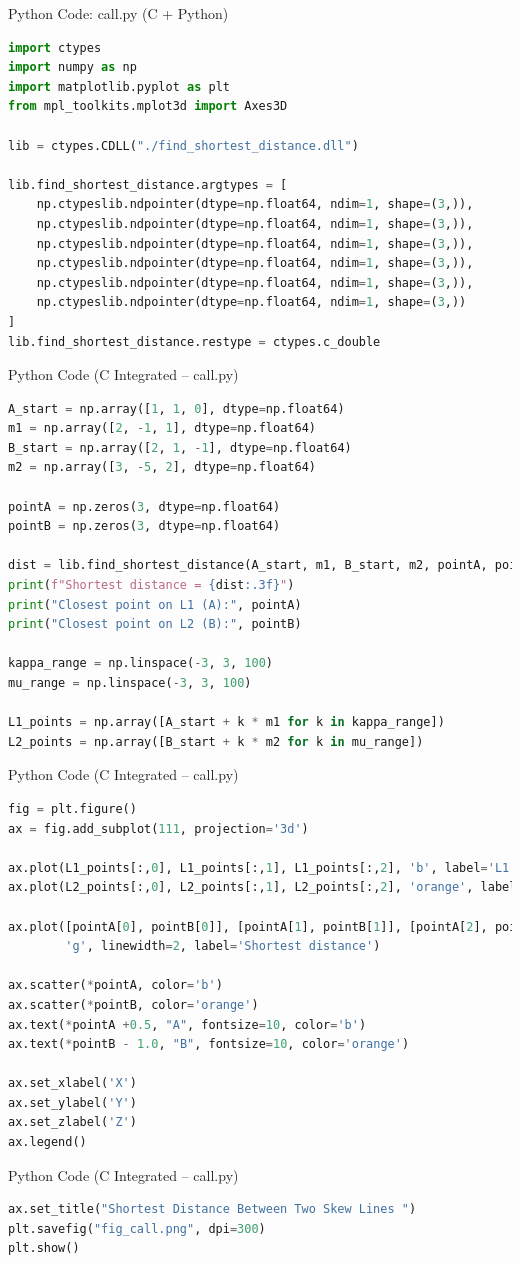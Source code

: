 \documentclass{beamer}
\begin{document}
\begin{frame}[fragile]{Python Code: call.py (C + Python)}
\begin{lstlisting}[language=Python]
import ctypes
import numpy as np
import matplotlib.pyplot as plt
from mpl_toolkits.mplot3d import Axes3D

lib = ctypes.CDLL("./find_shortest_distance.dll")

lib.find_shortest_distance.argtypes = [
    np.ctypeslib.ndpointer(dtype=np.float64, ndim=1, shape=(3,)),
    np.ctypeslib.ndpointer(dtype=np.float64, ndim=1, shape=(3,)),
    np.ctypeslib.ndpointer(dtype=np.float64, ndim=1, shape=(3,)),
    np.ctypeslib.ndpointer(dtype=np.float64, ndim=1, shape=(3,)),
    np.ctypeslib.ndpointer(dtype=np.float64, ndim=1, shape=(3,)),
    np.ctypeslib.ndpointer(dtype=np.float64, ndim=1, shape=(3,))
]
lib.find_shortest_distance.restype = ctypes.c_double
\end{lstlisting}
\end{frame}

\begin{frame}[fragile]{Python Code (C Integrated – call.py)
}
\begin{lstlisting}[language=Python]
A_start = np.array([1, 1, 0], dtype=np.float64)
m1 = np.array([2, -1, 1], dtype=np.float64)
B_start = np.array([2, 1, -1], dtype=np.float64)
m2 = np.array([3, -5, 2], dtype=np.float64)

pointA = np.zeros(3, dtype=np.float64)
pointB = np.zeros(3, dtype=np.float64)

dist = lib.find_shortest_distance(A_start, m1, B_start, m2, pointA, pointB)
print(f"Shortest distance = {dist:.3f}")
print("Closest point on L1 (A):", pointA)
print("Closest point on L2 (B):", pointB)

kappa_range = np.linspace(-3, 3, 100)
mu_range = np.linspace(-3, 3, 100)

L1_points = np.array([A_start + k * m1 for k in kappa_range])
L2_points = np.array([B_start + k * m2 for k in mu_range])
\end{lstlisting}
\end{frame}

\begin{frame}[fragile]{Python Code (C Integrated – call.py)
}
\begin{lstlisting}[language=Python]
fig = plt.figure()
ax = fig.add_subplot(111, projection='3d')

ax.plot(L1_points[:,0], L1_points[:,1], L1_points[:,2], 'b', label='L1')
ax.plot(L2_points[:,0], L2_points[:,1], L2_points[:,2], 'orange', label='L2')

ax.plot([pointA[0], pointB[0]], [pointA[1], pointB[1]], [pointA[2], pointB[2]],
        'g', linewidth=2, label='Shortest distance')

ax.scatter(*pointA, color='b')
ax.scatter(*pointB, color='orange')
ax.text(*pointA +0.5, "A", fontsize=10, color='b')
ax.text(*pointB - 1.0, "B", fontsize=10, color='orange')

ax.set_xlabel('X')
ax.set_ylabel('Y')
ax.set_zlabel('Z')
ax.legend()
\end{lstlisting}
\end{frame}

\begin{frame}[fragile]{Python Code (C Integrated – call.py)
}
\begin{lstlisting}[language=Python]
ax.set_title("Shortest Distance Between Two Skew Lines ")
plt.savefig("fig_call.png", dpi=300)
plt.show()
\end{lstlisting}
\end{frame}
\end{document}
